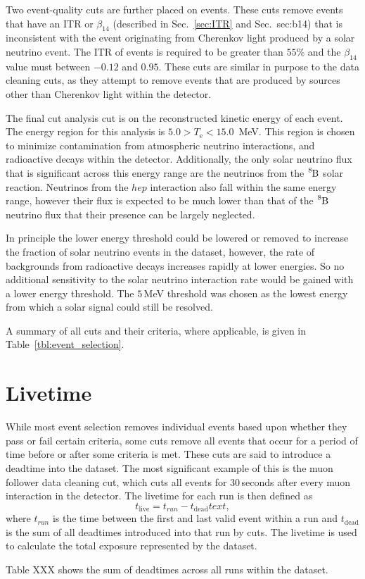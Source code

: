 Two event-quality cuts are further placed on events. These cuts remove events
that have an ITR or $\beta_{14}$ (described in Sec.~\ref{sec:ITR} and Sec.~{sec:b14})
that is inconsistent with the event originating from Cherenkov light produced
by a solar neutrino event.
The ITR of events is required to be greater than $55$\% and the $\beta_{14}$
value must between $-0.12$ and $0.95$.
These cuts are similar in purpose to the data cleaning cuts, as they attempt to
remove events that are produced by sources other than Cherenkov light within
the detector.

The final cut analysis cut is on the reconstructed kinetic energy of each event.
The energy region for this analysis is $5.0 > T_{\mathrm{e}} < 15.0$\, MeV.
This region is chosen to minimize contamination from atmospheric neutrino
interactions, and radioactive decays within the detector.
Additionally, the only solar neutrino flux that is significant across this energy range
are the neutrinos from the $\ce{^{8}B}$ solar reaction.
Neutrinos from the $hep$ interaction also fall within the same energy range,
however their flux is expected to be much lower than that of the $\ce{^{8}B}$
neutrino flux that their presence can be largely neglected.

In principle the lower energy threshold could be lowered or removed to
increase the fraction of solar neutrino events in the dataset, however,
the rate of backgrounds from radioactive decays increases rapidly at lower
energies. So no additional sensitivity to the solar neutrino interaction
rate would be gained with a lower energy threshold.
The $5$\,MeV threshold was chosen as the lowest energy from which a solar
signal could still be resolved.

A summary of all cuts and their criteria, where applicable, is given in Table~\ref{tbl:event_selection}.

\begin{table}
    \centering
    \begin{tabular}
    \end{tabular}
    \caption{Cuts}
    \label{tbl:event_selection}
\end{table}

\section{Livetime}
While most event selection removes individual events based upon whether they
pass or fail certain criteria, some cuts remove all events that occur for a
period of time before or after some criteria is met.
These cuts are said to introduce a deadtime into the dataset.
The most significant example of this is the muon follower data cleaning cut, which
cuts all events for 30\,seconds after every muon interaction in the detector.
The livetime for each run is then defined as
\begin{equation}
    t_{\mathrm{live}} = t_{run} - t_{\mathrm{dead}}text{,}
\end{equation}
where $t_{run}$ is the time between the first and last valid event within a run
and $t_{\mathrm{dead}}$ is the sum of all deadtimes introduced into that run by cuts.
The livetime is used to calculate the total exposure represented by the dataset.

Table XXX shows the sum of deadtimes across all runs within the dataset.
